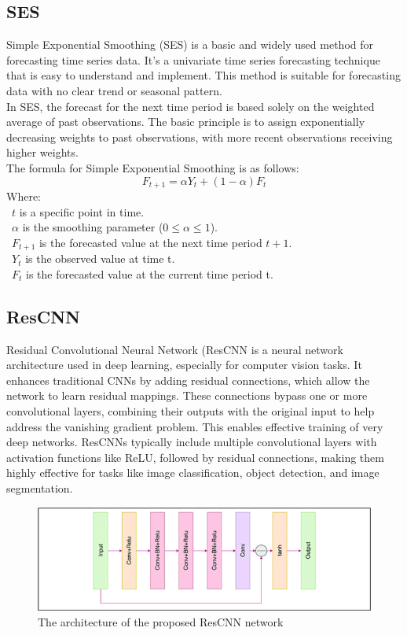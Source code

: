 \documentclass{ieeeojies}
\begin{document}
\subsection{SES}
Simple Exponential Smoothing (SES) \cite{b9} is a basic and widely used method for forecasting time series data. It's a univariate time series forecasting technique that is easy to understand and implement. This method is suitable for forecasting data with no clear trend or seasonal pattern.\\
In SES, the forecast for the next time period is based solely on the weighted average of past observations. The basic principle is to assign exponentially decreasing weights to past observations, with more recent observations receiving higher weights.\\
The formula for Simple Exponential Smoothing is as follows:
    \[F_{t+1} = \alpha Y_t + (1 - \alpha) F_t\]
Where:\\
    \indent\ \(t\) is a specific point in time.\\
    \indent\ \(\alpha\) is the smoothing parameter (\(0 \leq \alpha \leq 1\)).\\
    \indent\ \(F_{t+1}\) is the forecasted value at the next time period \(t+1\).\\
    \indent\ \(Y_t\) is the observed value at time t.\\
    \indent\ \(F_t\) is the forecasted value at the current time period t.

\subsection{ResCNN}
Residual Convolutional Neural Network (ResCNN \cite{b10} is a neural network architecture used in deep learning, especially for computer vision tasks. It enhances traditional CNNs by adding residual connections, which allow the network to learn residual mappings. These connections bypass one or more convolutional layers, combining their outputs with the original input to help address the vanishing gradient problem. This enables effective training of very deep networks. ResCNNs typically include multiple convolutional layers with activation functions like ReLU, followed by residual connections, making them highly effective for tasks like image classification, object detection, and image segmentation.\\

\begin{figure}[H]
    \centering
    \includegraphics[width=\linewidth]{bibliography/ResCNN.png}
    \caption{The architecture of the proposed ResCNN network}
    \label{fig:enter-label}
\end{figure}
\end{document}
